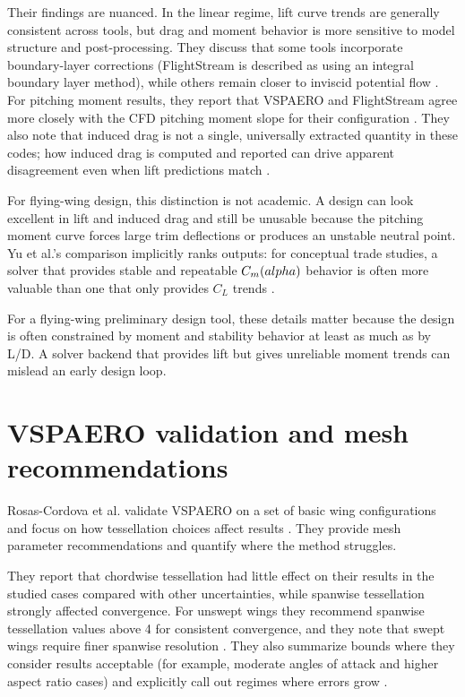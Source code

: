 Their findings are nuanced. In the linear regime, lift curve trends are generally consistent across tools, but drag and moment behavior is more sensitive to model structure and post-processing. They discuss that some tools incorporate boundary-layer corrections (FlightStream is described as using an integral boundary layer method), while others remain closer to inviscid potential flow \cite{Yu2022ICAS}. For pitching moment results, they report that VSPAERO and FlightStream agree more closely with the CFD pitching moment slope for their configuration \cite{Yu2022ICAS}. They also note that induced drag is not a single, universally extracted quantity in these codes; how induced drag is computed and reported can drive apparent disagreement even when lift predictions match \cite{Yu2022ICAS}.

For flying-wing design, this distinction is not academic. A design can look excellent in lift and induced drag and still be unusable because the pitching moment curve forces large trim deflections or produces an unstable neutral point. Yu et al.'s comparison implicitly ranks outputs: for conceptual trade studies, a solver that provides stable and repeatable $C_m(\\alpha)$ behavior is often more valuable than one that only provides $C_L$ trends \cite{Yu2022ICAS}.

For a flying-wing preliminary design tool, these details matter because the design is often constrained by moment and stability behavior at least as much as by L/D. A solver backend that provides lift but gives unreliable moment trends can mislead an early design loop.

\section{VSPAERO validation and mesh recommendations}
Rosas-Cordova et al. validate VSPAERO on a set of basic wing configurations and focus on how tessellation choices affect results \cite{RosasCordova2024VSPAERO}. They provide mesh parameter recommendations and quantify where the method struggles.

They report that chordwise tessellation had little effect on their results in the studied cases compared with other uncertainties, while spanwise tessellation strongly affected convergence. For unswept wings they recommend spanwise tessellation values above 4 for consistent convergence, and they note that swept wings require finer spanwise resolution \cite{RosasCordova2024VSPAERO}. They also summarize bounds where they consider results acceptable (for example, moderate angles of attack and higher aspect ratio cases) and explicitly call out regimes where errors grow \cite{RosasCordova2024VSPAERO}.


